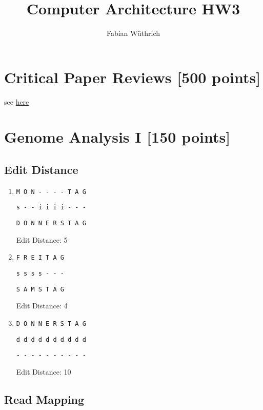\documentclass[a4paper]{article}
\title{Computer Architecture HW3}
\author{Fabian Wüthrich}
\begin{document}
\maketitle

\section{Critical Paper Reviews [500 points]}

see \href{https://safari.ethz.ch/review/architecture20/}{here}

\section{Genome Analysis I [150 points]}

\subsection{Edit Distance}

\begin{enumerate}[label=\alph*)]
    \item \texttt{M O N - - - - T A G}

          \texttt{s - - i i i i - - -}

          \texttt{D O N N E R S T A G}

          Edit Distance: 5
    \item \texttt{F R E I T A G}

          \texttt{s s s s - - -}

          \texttt{S A M S T A G}

          Edit Distance: 4
    \item \texttt{D O N N E R S T A G}

          \texttt{d d d d d d d d d d}

          \texttt{- - - - - - - - - -}

          Edit Distance: 10
\end{enumerate}

\subsection{Read Mapping}
\end{document}
